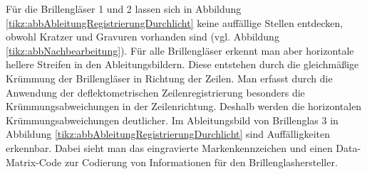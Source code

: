 \noindent
Für die Brillengläser 1 und 2 lassen sich in Abbildung \ref{tikz:abbAbleitungRegistrierungDurchlicht} keine auffällige Stellen entdecken, obwohl Kratzer und Gravuren vorhanden sind (vgl. Abbildung \ref{tikz:abbNachbearbeitung}).
Für alle Brillengläser erkennt man aber horizontale hellere Streifen in den Ableitungsbildern.
Diese entstehen durch die gleichmäßige Krümmung der Brillengläser in Richtung der Zeilen.
Man erfasst durch die Anwendung der deflektometrischen Zeilenregistrierung besonders die Krüm\-mungs\-ab\-wei\-chun\-gen in der Zeilenrichtung.
Deshalb werden die horizontalen Krüm\-mungs\-ab\-wei\-chun\-gen deutlicher.
Im Ableitungsbild von Brillenglas 3 in Abbildung \ref{tikz:abbAbleitungRegistrierungDurchlicht} sind Auffälligkeiten erkennbar.
Dabei sieht man das eingravierte Markenkennzeichen und einen Data-Matrix-Code zur Codierung von Informationen für den Brillenglashersteller.